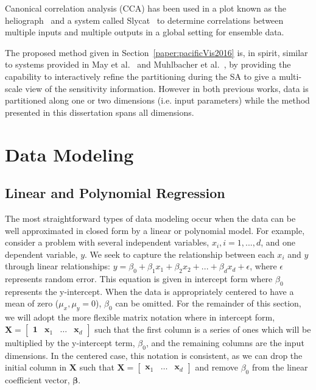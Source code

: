 Canonical correlation analysis (CCA) has been used in a plot known as the heliograph~\cite{DeganiShaftoOlson2006} and a system called Slycat~\cite{CrossnoSheadSielicki2015} to determine correlations between multiple inputs and multiple outputs in a global setting for ensemble data.

The proposed method given in Section~\ref{paper:pacificVis2016} is, in spirit, similar to systems provided in May et al.~\cite{MayBannachDavey2011} and Muhlbacher et al.~\cite{MuhlbacherPiringer2013}, by providing the capability to interactively refine the partitioning during the SA to give a multi-scale view of the sensitivity information.
%
However in both previous works, data is partitioned along one or two dimensions (i.e. input parameters) while the method presented in this dissertation spans all dimensions.

\section{Data Modeling}
\label{sec:regression}
\subsection{Linear and Polynomial Regression}
The most straightforward types of data modeling occur when the data can be well approximated in closed form by a linear or polynomial model.
%
For example, consider a problem with several independent variables, $x_i, i=1,...,d$, and one dependent variable, $y$.
%
We seek to capture the relationship between each $x_i$ and $y$ through linear relationships: $y = \beta_0 + \beta_1 x_1 + \beta_2 x_2 + ... + \beta_d x_d + \epsilon$, where $\epsilon$ represents random error.
%
This equation is given in intercept form where $\beta_0$ represents the y-intercept.
%
When the data is appropriately centered to have a mean of zero ($\mu_x,\mu_y = 0$), $\beta_0$ can be omitted.
%
For the remainder of this section, we will adopt the more flexible matrix notation where in intercept form, $\textbf{X} = \begin{bmatrix}\textbf{1} & \textbf{x}_1 & \ldots & \textbf{x}_d \end{bmatrix}$ such that the first column is a series of ones which will be multiplied by the y-intercept term, $\beta_0$, and the remaining columns are the input dimensions.
%
In the centered case, this notation is consistent, as we can drop the initial column in $\textbf{X}$ such that $\textbf{X} = \begin{bmatrix}\textbf{x}_1 & \ldots & \textbf{x}_d\end{bmatrix}$ and remove $\beta_0$ from the linear coefficient vector, $\boldsymbol\beta$.

